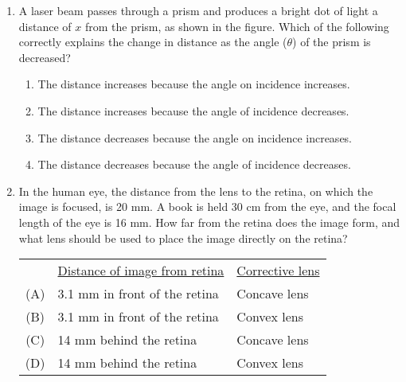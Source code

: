 \documentclass{../../../oss-classkick}
\begin{document}
\begin{multicols*}{2}
\begin{enumerate}[leftmargin=18pt]
  \item A laser beam passes through a prism and produces a bright dot of light
    a distance of $x$ from the prism, as shown in the figure. Which of the
    following correctly explains the change in distance as the angle
    ($\theta$) of the prism is decreased?
    \begin{enumerate}[nosep,leftmargin=18pt,label=(\Alph*)]
    \item The distance increases because the angle on incidence increases.
    \item The distance increases because the angle of incidence decreases.
    \item The distance decreases because the angle on incidence increases.
    \item The distance decreases because the angle of incidence decreases.
    \end{enumerate}
    \vspace{.7in}
    
  \item In the human eye, the distance from the lens to the retina, on which the
    image is focused, is 20 mm. A book is held 30 cm from the eye, and
    the focal length of the eye is 16 mm. How far from the retina does the
    image form, and what lens should be used to place the image directly
    on the retina?
    
    \begin{tabular}{cll}
      & \underline{Distance of image from retina}
      & \underline{Corrective lens} \\
      (A) & 3.1 mm in front of the retina & Concave lens \\
      (B) & 3.1 mm in front of the retina & Convex lens \\
      (C) & 14 mm behind the retina & Concave lens \\
      (D) & 14 mm behind the retina & Convex lens
    \end{tabular}
  \end{enumerate}
\end{multicols*}
\newpage


\genfreedirections
\end{document}
